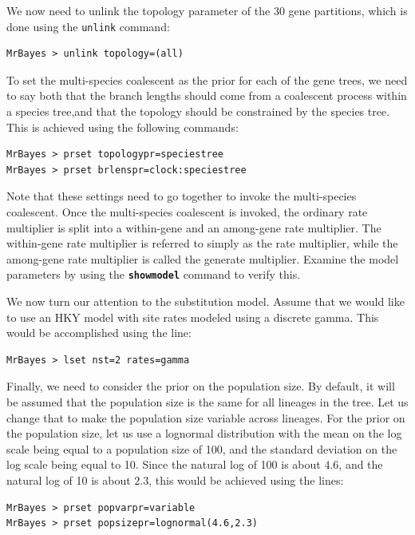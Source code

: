 \documentclass[12pt]{book}
\newcommand{\ttt}[1]{\texttt{#1}}
\newcommand{\tb}[1]{\ttt{\textbf{#1}}}
\begin{document}
We now need to unlink the topology parameter of the 30 gene partitions, which is done using the
\texttt{unlink} command:

\begin{Verbatim}
MrBayes > unlink topology=(all)
\end{Verbatim}

To set the multi-species coalescent as the prior for each of the gene trees, we need to say both
that the branch lengths should come from a coalescent process within a species tree,and that the
topology should be constrained by the species tree. This is achieved using the following commands:

\begin{Verbatim}
MrBayes > prset topologypr=speciestree
MrBayes > prset brlenspr=clock:speciestree
\end{Verbatim}

Note that these settings need to go together to invoke the multi-species coalescent. Once the
multi-species coalescent is invoked, the ordinary rate multiplier is split into a within-gene and
an among-gene rate multiplier. The within-gene rate multiplier is referred to simply as the rate
multiplier, while the among-gene rate multiplier is called the generate multiplier. Examine the
model parameters by using the \tb{showmodel} command to verify this.

We now turn our attention to the substitution model. Assume that we would like to use an HKY model
with site rates modeled using a discrete gamma. This would be accomplished using the line:

\begin{Verbatim}
MrBayes > lset nst=2 rates=gamma
\end{Verbatim}

Finally, we need to consider the prior on the population size. By default, it will be assumed that
the population size is the same for all lineages in the tree. Let us change that to make the
population size variable across lineages. For the prior on the population size, let us use a
lognormal distribution with the mean on the log scale being equal to a population size of 100, and
the standard deviation on the log scale being equal to 10. Since the natural log of 100 is about
$4.6$, and the natural log of 10 is about $2.3$, this would be achieved using the lines:

\begin{Verbatim}
MrBayes > prset popvarpr=variable
MrBayes > prset popsizepr=lognormal(4.6,2.3)
\end{Verbatim}
\end{document}

